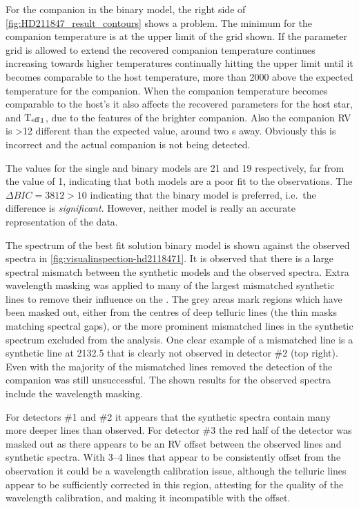 For the companion in the binary model, the right side of \cref{fig:HD211847_result_contours} shows a problem.
The minimum \textchisquared{} for the companion temperature is at the upper limit of the grid shown.
If the parameter grid is allowed to extend the recovered companion temperature continues increasing towards higher temperatures continually hitting the upper limit until it becomes comparable to the host temperature, more than 2000\K{} above the expected temperature for the companion.
When the companion temperature becomes comparable to the host's it also affects the recovered parameters for the host star, \Rvone and \({\textrm{T}_{\mathrm{eff}}}_{1}\), due to the features of the brighter companion.
Also the companion {RV} is >12\kmps{} different than the expected value, around two \fwhm{}s away.
Obviously this is incorrect and the actual companion is not being detected.

The \textchisquaredreduced{} values for the single and binary models are 21 and 19 respectively, far from the value of 1, indicating that both models are a poor fit to the observations.
The \(\Delta {BIC} = 3812 >10\) indicating that the binary model is preferred, i.e.\ the difference is \textit{significant}.
However, neither model is really an accurate representation of the data.

The spectrum of the best fit solution binary model is shown against the observed spectra in \cref{fig:visualinspection-hd2118471}.
It is observed that there is a large spectral mismatch between the synthetic models and the observed spectra.
Extra wavelength masking was applied to many of the largest mismatched synthetic lines to remove their influence on the \textchisquared{}.
The grey areas mark regions which have been masked out, either from the centres of deep telluric lines (the thin masks matching spectral gaps), or the more prominent mismatched lines in the synthetic spectrum excluded from the \textchisquared{} analysis.
One clear example of a mismatched line is a synthetic line at 2132.5\nm{} that is clearly not observed in detector \#2 (top right).
Even with the majority of the mismatched lines removed the detection of the companion was still unsuccessful.
The shown results for the observed spectra include the wavelength masking.

For detectors \#1 and \#2 it appears that the synthetic spectra contain many more deeper lines than observed.
For detector \#3 the red half of the detector was masked out as there appears to be an {RV} offset between the observed lines and synthetic spectra.
With 3--4 lines that appear to be consistently offset from the observation it could be a wavelength calibration issue, although the telluric lines appear to be sufficiently corrected in this region, attesting for the quality of the wavelength calibration, and making it incompatible with the offset.

